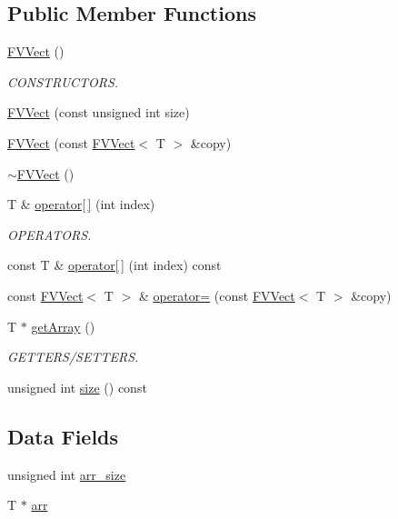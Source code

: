 \subsection*{Public Member Functions}
\begin{DoxyCompactItemize}
\item 
\hyperlink{classFVL_1_1FVVect_a0d80f50251de9133bf7d8d2777483267}{FVVect} ()
\begin{DoxyCompactList}\small\item\em CONSTRUCTORS. \item\end{DoxyCompactList}\item 
\hyperlink{classFVL_1_1FVVect_a0db6ba100bcfe615dd2dd090a1cd49f7}{FVVect} (const unsigned int size)
\item 
\hyperlink{classFVL_1_1FVVect_a0ead0d4efe02fbbe196f3d475269aeb8}{FVVect} (const \hyperlink{classFVL_1_1FVVect}{FVVect}$<$ T $>$ \&copy)
\item 
\hyperlink{classFVL_1_1FVVect_a85fca1ebbe0004cffb2d9b2582181084}{$\sim$FVVect} ()
\item 
T \& \hyperlink{classFVL_1_1FVVect_a2d4b36a43041d6505f82836a6aeccd52}{operator\mbox{[}$\,$\mbox{]}} (int index)
\begin{DoxyCompactList}\small\item\em OPERATORS. \item\end{DoxyCompactList}\item 
const T \& \hyperlink{classFVL_1_1FVVect_a56e773dcafc33b12d2b27d2c7a174f3a}{operator\mbox{[}$\,$\mbox{]}} (int index) const 
\item 
const \hyperlink{classFVL_1_1FVVect}{FVVect}$<$ T $>$ \& \hyperlink{classFVL_1_1FVVect_a9395b1099c954aa5e33a66d1b7a1f1cd}{operator=} (const \hyperlink{classFVL_1_1FVVect}{FVVect}$<$ T $>$ \&copy)
\item 
T $\ast$ \hyperlink{classFVL_1_1FVVect_ad57caa1a97910998e7b9453ccbb3831c}{getArray} ()
\begin{DoxyCompactList}\small\item\em GETTERS/SETTERS. \item\end{DoxyCompactList}\item 
unsigned int \hyperlink{classFVL_1_1FVVect_a90ca964ebcc1b02bbcde225edd49e812}{size} () const 
\end{DoxyCompactItemize}
\subsection*{Data Fields}
\begin{DoxyCompactItemize}
\item 
unsigned int \hyperlink{classFVL_1_1FVVect_a34a728cbcdbff333ec99c822697e3679}{arr\_\-size}
\item 
T $\ast$ \hyperlink{classFVL_1_1FVVect_a146e9e7358f9c0ad7b78c73519623f6c}{arr}
\end{DoxyCompactItemize}
